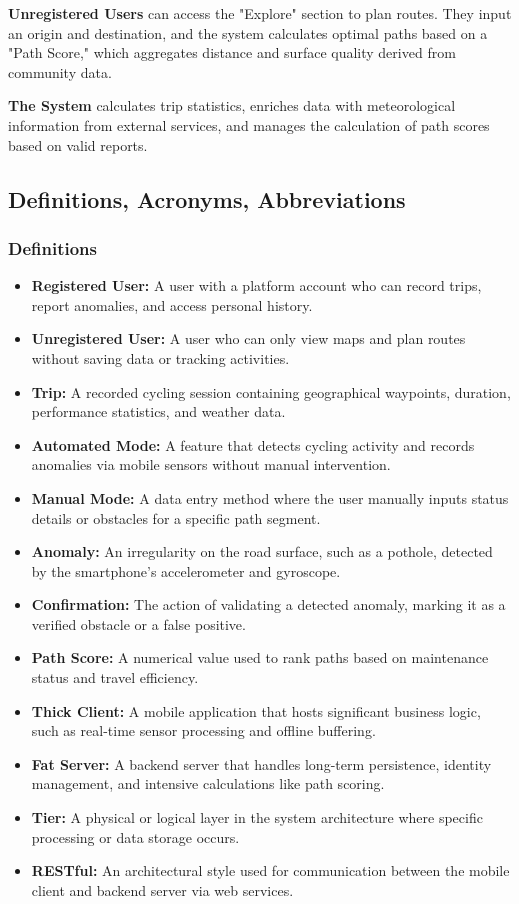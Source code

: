 \textbf{Unregistered Users} can access the "Explore" section to plan routes. They input an origin and destination, and the system calculates optimal paths based on a "Path Score," which aggregates distance and surface quality derived from community data.

\textbf{The System }calculates trip statistics, enriches data with meteorological information from external services, and manages the calculation of path scores based on valid reports.


\subsection{Definitions, Acronyms, Abbreviations}

\subsubsection{Definitions}
\begin{itemize}
    \item \textbf{Registered User:} A user with a platform account who can record trips, report anomalies, and access personal history.
    \item \textbf{Unregistered User:} A user who can only view maps and plan routes without saving data or tracking activities.
    \item \textbf{Trip:} A recorded cycling session containing geographical waypoints, duration, performance statistics, and weather data.
    \item \textbf{Automated Mode:} A feature that detects cycling activity and records anomalies via mobile sensors without manual intervention.
    \item \textbf{Manual Mode:} A data entry method where the user manually inputs status details or obstacles for a specific path segment.
    \item \textbf{Anomaly:} An irregularity on the road surface, such as a pothole, detected by the smartphone's accelerometer and gyroscope.
    \item \textbf{Confirmation:} The action of validating a detected anomaly, marking it as a verified obstacle or a false positive.
    \item \textbf{Path Score:} A numerical value used to rank paths based on maintenance status and travel efficiency.
    \item \textbf{Thick Client:} A mobile application that hosts significant business logic, such as real-time sensor processing and offline buffering.
    \item \textbf{Fat Server:} A backend server that handles long-term persistence, identity management, and intensive calculations like path scoring.
    \item \textbf{Tier:} A physical or logical layer in the system architecture where specific processing or data storage occurs.
    \item \textbf{RESTful:} An architectural style used for communication between the mobile client and backend server via web services.
\end{itemize}

